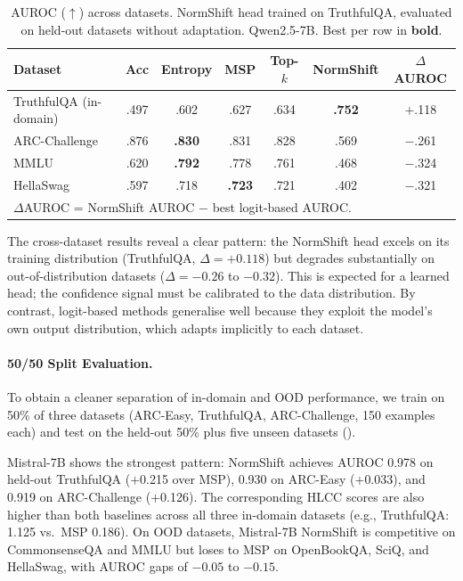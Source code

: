 \documentclass[11pt,a4paper]{article}
\begin{document}
\begin{table}[H]
\centering
\caption{AUROC ($\uparrow$) across datasets.
         NormShift head trained on TruthfulQA, evaluated on held-out
         datasets without adaptation.  Qwen2.5-7B.
         Best per row in \textbf{bold}.}
\label{tab:cross-dataset}
\small
\begin{tabular}{@{}lcccccc@{}}
\toprule
Dataset & Acc & Entropy & MSP & Top-$k$ & NormShift & $\Delta$AUROC \\
\midrule
TruthfulQA (in-domain) & .497 & .602 & .627 & .634 & \textbf{.752} & $+$.118 \\
ARC-Challenge          & .876 & \textbf{.830} & .831 & .828 & .569 & $-$.261 \\
MMLU                   & .620 & \textbf{.792} & .778 & .761 & .468 & $-$.324 \\
HellaSwag              & .597 & .718 & \textbf{.723} & .721 & .402 & $-$.321 \\
\bottomrule
\multicolumn{7}{l}{\scriptsize $\Delta$AUROC = NormShift AUROC $-$ best logit-based AUROC.}
\end{tabular}
\end{table}

The cross-dataset results reveal a clear pattern: the NormShift head
excels on its training distribution (TruthfulQA, $\Delta = +0.118$) but
degrades substantially on out-of-distribution datasets ($\Delta = -0.26$
to $-0.32$).  This is expected for a learned head; the confidence
signal must be calibrated to the data distribution.  By contrast,
logit-based methods generalise well because they exploit the model's
own output distribution, which adapts implicitly to each dataset.

\paragraph{50/50 Split Evaluation.}
To obtain a cleaner separation of in-domain and OOD performance, we
train on 50\% of three datasets (ARC-Easy, TruthfulQA, ARC-Challenge,
150 examples each) and test on the held-out 50\% plus five unseen
datasets ().

Mistral-7B shows the strongest pattern: NormShift achieves AUROC 0.978
on held-out TruthfulQA ($+$0.215 over MSP), 0.930 on ARC-Easy
($+$0.033), and 0.919 on ARC-Challenge ($+$0.126).  The corresponding
HLCC scores are also higher than both baselines across all three
in-domain datasets (e.g., TruthfulQA: 1.125 vs.\ MSP 0.186).  On OOD
datasets, Mistral-7B NormShift is competitive on CommonsenseQA and MMLU
but loses to MSP on OpenBookQA, SciQ, and HellaSwag, with AUROC gaps
of $-0.05$ to $-0.15$.
\end{document}
